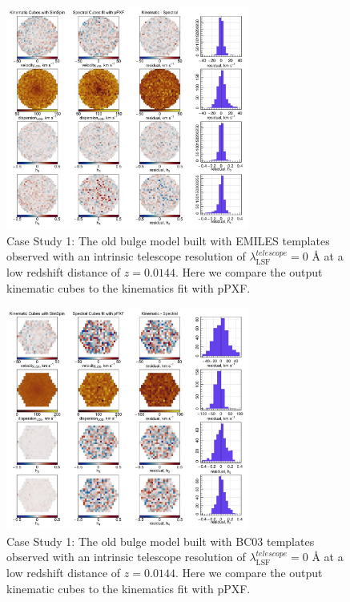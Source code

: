 \documentclass[
  journal=pasa,
  manuscript=research-paper, %
  year=2020,
  volume=37,
]{cup-journal}
\begin{document}
\begin{figure}
    \centering
    \includegraphics[keepaspectratio, width=8cm]{Figures/cs1_old_bulge_velocities_lowz_EMILES.jpeg}
    \caption{Case Study 1: The old bulge model built with EMILES templates observed with an intrinsic telescope resolution of  $\lambda_{\text{LSF}}^{telescope} = 0$ \AA{} at a low redshift distance of $z = 0.0144$. Here we compare the output kinematic cubes to the kinematics fit with pPXF.}
    \label{fig:cs1_oldbulge_EMILES}
\end{figure}

\begin{figure}
    \centering
    \includegraphics[keepaspectratio, width=8cm]{Figures/cs1_old_bulge_velocities_lowz_BC03hr.jpeg}
    \caption{Case Study 1: The old bulge model built with BC03 templates observed with an intrinsic telescope resolution of  $\lambda_{\text{LSF}}^{telescope} = 0$ \AA{} at a low redshift distance of $z = 0.0144$. Here we compare the output kinematic cubes to the kinematics fit with pPXF.}
    \label{fig:cs1_oldbulge_BC03}
\end{figure}

\FloatBarrier
\end{document}
